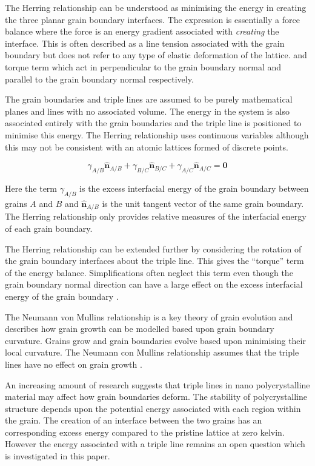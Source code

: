 \documentclass[12pt,a4paper]{book}
\begin{document}
The Herring relationship can be understood as minimising the energy in creating the three planar grain boundary interfaces. The expression is essentially a force balance where the force is an energy gradient associated with \emph{creating} the interface. This is often described as a line tension associated with the grain boundary but does not refer to any type of elastic deformation of the lattice. and torque term which act in perpendicular to the grain boundary normal and parallel to the grain boundary normal respectively. 

The grain boundaries and triple lines are assumed to be purely mathematical planes and lines with no associated volume. The energy in the system is also associated entirely with the grain boundaries and the triple line is positioned to minimise this energy.  The Herring relationship uses continuous variables although this may not be consistent with an atomic lattices formed of discrete points.     
 

\[\gamma_{A/B}\mathbf{\hat{n}}_{A/B} + \gamma_{B/C}\mathbf{\hat{n}}_{B/C} + \gamma_{A/C}\mathbf{\hat{n}}_{A/C} =\mathbf{0} \]

Here the term $\gamma_{A/B}$ is the excess interfacial energy of the grain boundary between grains $A$ and $B$ and $\mathbf{\hat{n}}_{A/B}$ is the unit tangent vector of the same grain boundary. The Herring relationship only provides relative measures of the interfacial energy of each grain boundary.


The Herring relationship can be extended further by considering the rotation of the grain boundary interfaces about the triple line. This gives the ``torque'' term of the energy balance. Simplifications often neglect this term even though the grain boundary normal direction can have a large effect on the excess interfacial energy of the grain boundary \cite{Rowenhurst}.

The Neumann von Mullins relationship is a key theory of grain evolution and describes how grain growth can be modelled based upon grain boundary curvature. Grains grow and grain boundaries evolve based upon minimising their local curvature. The Neumann con Mullins relationship assumes that the triple lines have no effect on grain growth \cite{GOTTSTEIN2010914}.

An increasing amount of research suggests that triple lines in nano polycrystalline material may affect how grain boundaries deform. The stability of polycrystalline structure depends upon the potential energy associated with each region within the grain. The creation of an interface between the two grains has an corresponding excess energy compared to the pristine lattice at zero kelvin. However the energy associated with a triple line remains an open question which is investigated in this paper.
\end{document}

